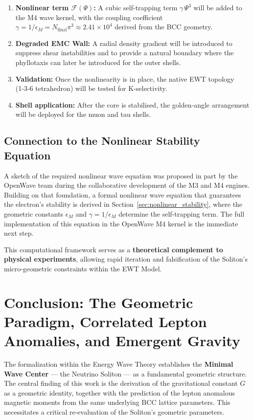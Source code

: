 \documentclass[10pt,a4paper]{article}
\begin{document}
\begin{enumerate}
	\item \textbf{Nonlinear term $\mathcal{F}(\Psi)$:} A cubic self-trapping
	term $\gamma\,\Psi^{3}$ will be added to the M4 wave kernel, with the
	coupling coefficient $\gamma = 1/\epsilon_{M} = N_{\text{final}}\pi^{3}
	\approx 2.41\times 10^{4}$ derived from the BCC geometry.
	\item \textbf{Degraded EMC Wall:} A radial density gradient will be
	introduced to suppress shear instabilities and to provide a natural
	boundary where the phyllotaxis can later be introduced for the outer
	shells.
	\item \textbf{Validation:} Once the nonlinearity is in place, the native
	EWT topology (1‑3‑6 tetrahedron) will be tested for K‑selectivity.
	\item \textbf{Shell application:} After the core is stabilised, the
	golden‑angle arrangement will be deployed for the muon and tau shells.
\end{enumerate}

\subsection*{Connection to the Nonlinear Stability Equation}

A sketch of the required nonlinear wave equation was proposed in part
by the OpenWave team during the collaborative development of the M3 and
M4 engines.  Building on that foundation, a formal nonlinear wave
equation that guarantees the electron's stability is derived in
Section~\ref{sec:nonlinear_stability}, where the geometric constants
$\epsilon_M$ and $\gamma = 1/\epsilon_M$ determine the self‑trapping
term.  The full implementation of this equation in the OpenWave M4
kernel is the immediate next step.

This computational framework serves as a \textbf{theoretical complement
	to physical experiments}, allowing rapid iteration and falsification of
the Soliton's micro‑geometric constraints within the EWT Model.


\section{Conclusion: The Geometric Paradigm, Correlated Lepton Anomalies, and Emergent Gravity}
\label{sec:conclusion}

The formalization within the Energy Wave Theory establishes the \textbf{Minimal Wave Center} — the Neutrino Soliton — as a fundamental geometric structure. The central finding of this work is the derivation of the gravitational constant \(G\) as a geometric identity, together with the prediction of the lepton anomalous magnetic moments from the same underlying BCC lattice parameters. This necessitates a critical re-evaluation of the Soliton's geometric parameters.
\end{document}
